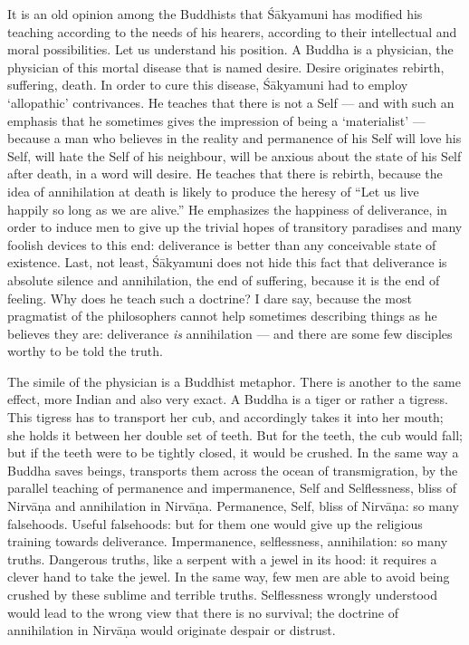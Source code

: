 \documentclass[a4paper, 11pt, oneside, english]{article}
\begin{document}
It is an old opinion among the Buddhists that Śākyamuni has modified his teaching according to the needs of his hearers, according to their intellectual and moral possibilities. Let us understand his position. A Buddha is a physician, the physician of this mortal disease that is named desire. Desire originates rebirth, suffering, death. In order to cure this disease, Śākyamuni had to employ `allopathic' contrivances. He teaches that there is not a Self --- and with such an emphasis that he sometimes gives the impression of being a `materialist' --- because a man who believes in the reality and permanence of his Self will love his Self, will hate the Self of his neighbour, will be anxious about the state of his Self after death, in a word will desire. He teaches that there is rebirth, because the idea of annihilation at death is likely to produce the heresy of ``Let us live happily so long as we are alive.'' He emphasizes the happiness of deliverance, in order to induce men to give up the trivial hopes of transitory paradises and many foolish devices to this end: deliverance is better than any conceivable state of existence. Last, not least, Śākyamuni does not hide this fact that deliverance is absolute silence and annihilation, the end of suffering, because it is the end of feeling. Why does he teach such a doctrine? I dare say, because the most pragmatist of the philosophers cannot help sometimes describing things as he believes they are: deliverance \emph{is} annihilation --- and there are some few disciples worthy to be told the truth.

The simile of the physician is a Buddhist metaphor. There is another to the same effect, more Indian and also very exact. A Buddha is a tiger or rather a tigress. This tigress has to transport her cub, and accordingly takes it into her mouth; she holds it between her double set of teeth. But for the teeth, the cub would fall; but if the teeth were to be tightly closed, it would be crushed. In the same way a Buddha saves beings, transports them across the ocean of transmigration, by the parallel teaching of permanence and impermanence, Self and Selflessness, bliss of Nirvāṇa and annihilation in Nirvāṇa. Permanence, Self, bliss of Nirvāṇa: so many falsehoods. Useful falsehoods: but for them one would give up the religious training towards deliverance. Impermanence, selflessness, annihilation: so many truths. Dangerous truths, like a serpent with a jewel in its hood: it requires a clever hand to take the jewel. In the same way, few men are able to avoid being crushed by these sublime and terrible truths. Selflessness wrongly understood would lead to the wrong view that there is no survival; the doctrine of annihilation in Nirvāṇa would originate despair or distrust.
\end{document}
